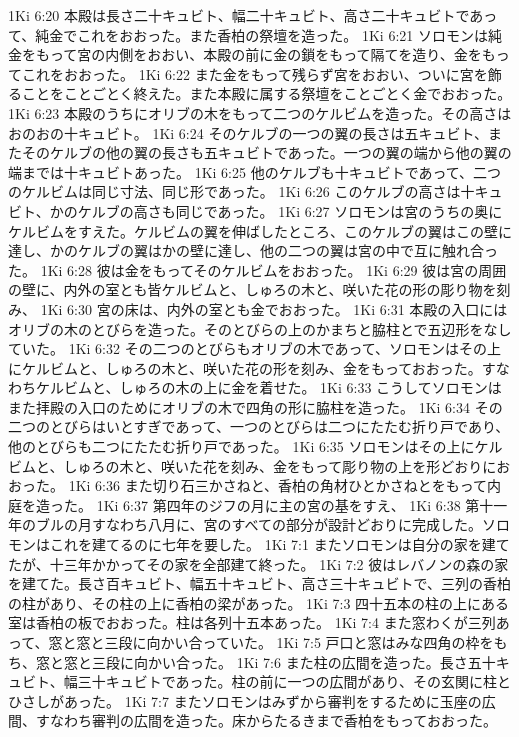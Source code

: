 1Ki 6:20  本殿は長さ二十キュビト、幅二十キュビト、高さ二十キュビトであって、純金でこれをおおった。また香柏の祭壇を造った。
1Ki 6:21  ソロモンは純金をもって宮の内側をおおい、本殿の前に金の鎖をもって隔てを造り、金をもってこれをおおった。
1Ki 6:22  また金をもって残らず宮をおおい、ついに宮を飾ることをことごとく終えた。また本殿に属する祭壇をことごとく金でおおった。
1Ki 6:23  本殿のうちにオリブの木をもって二つのケルビムを造った。その高さはおのおの十キュビト。
1Ki 6:24  そのケルブの一つの翼の長さは五キュビト、またそのケルブの他の翼の長さも五キュビトであった。一つの翼の端から他の翼の端までは十キュビトあった。
1Ki 6:25  他のケルブも十キュビトであって、二つのケルビムは同じ寸法、同じ形であった。
1Ki 6:26  このケルブの高さは十キュビト、かのケルブの高さも同じであった。
1Ki 6:27  ソロモンは宮のうちの奥にケルビムをすえた。ケルビムの翼を伸ばしたところ、このケルブの翼はこの壁に達し、かのケルブの翼はかの壁に達し、他の二つの翼は宮の中で互に触れ合った。
1Ki 6:28  彼は金をもってそのケルビムをおおった。
1Ki 6:29  彼は宮の周囲の壁に、内外の室とも皆ケルビムと、しゅろの木と、咲いた花の形の彫り物を刻み、
1Ki 6:30  宮の床は、内外の室とも金でおおった。
1Ki 6:31  本殿の入口にはオリブの木のとびらを造った。そのとびらの上のかまちと脇柱とで五辺形をなしていた。
1Ki 6:32  その二つのとびらもオリブの木であって、ソロモンはその上にケルビムと、しゅろの木と、咲いた花の形を刻み、金をもっておおった。すなわちケルビムと、しゅろの木の上に金を着せた。
1Ki 6:33  こうしてソロモンはまた拝殿の入口のためにオリブの木で四角の形に脇柱を造った。
1Ki 6:34  その二つのとびらはいとすぎであって、一つのとびらは二つにたたむ折り戸であり、他のとびらも二つにたたむ折り戸であった。
1Ki 6:35  ソロモンはその上にケルビムと、しゅろの木と、咲いた花を刻み、金をもって彫り物の上を形どおりにおおった。
1Ki 6:36  また切り石三かさねと、香柏の角材ひとかさねとをもって内庭を造った。
1Ki 6:37  第四年のジフの月に主の宮の基をすえ、
1Ki 6:38  第十一年のブルの月すなわち八月に、宮のすべての部分が設計どおりに完成した。ソロモンはこれを建てるのに七年を要した。
1Ki 7:1  またソロモンは自分の家を建てたが、十三年かかってその家を全部建て終った。
1Ki 7:2  彼はレバノンの森の家を建てた。長さ百キュビト、幅五十キュビト、高さ三十キュビトで、三列の香柏の柱があり、その柱の上に香柏の梁があった。
1Ki 7:3  四十五本の柱の上にある室は香柏の板でおおった。柱は各列十五本あった。
1Ki 7:4  また窓わくが三列あって、窓と窓と三段に向かい合っていた。
1Ki 7:5  戸口と窓はみな四角の枠をもち、窓と窓と三段に向かい合った。
1Ki 7:6  また柱の広間を造った。長さ五十キュビト、幅三十キュビトであった。柱の前に一つの広間があり、その玄関に柱とひさしがあった。
1Ki 7:7  またソロモンはみずから審判をするために玉座の広間、すなわち審判の広間を造った。床からたるきまで香柏をもっておおった。
